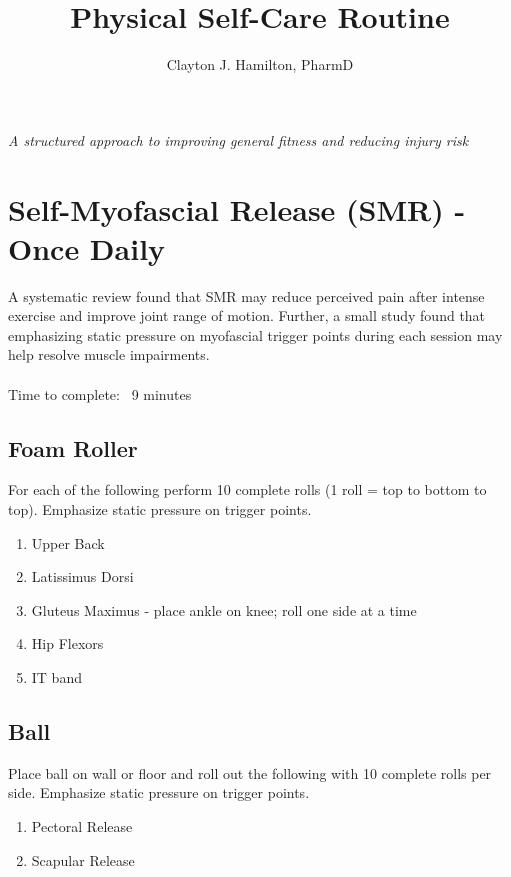 \documentclass[12pt, letterpaper]{article}
\title{Physical Self-Care Routine}
\author{Clayton J. Hamilton, PharmD}
\date{}
\begin{document}
\maketitle

\centerline{\textit{A structured approach to improving general fitness and reducing injury risk}}

\tableofcontents

\newpage %


\section{Self-Myofascial Release (SMR) - Once Daily}

A systematic review found that SMR may reduce perceived pain after 
intense exercise and improve joint range of motion.\cite{pmid26618062} Further, a small study found that
 emphasizing static pressure on myofascial trigger points during each session may help resolve muscle impairments.\cite{pmid30765920} 
 \\
 \\
Time to complete: ~9 minutes

\subsection{Foam Roller}

For each of the following perform 10 complete rolls (1 roll = top to bottom to top). Emphasize static pressure on trigger points.
\begin{enumerate}
    \item Upper Back
    \item Latissimus Dorsi
    \item Gluteus Maximus - place ankle on knee; roll one side at a time
    \item Hip Flexors
    \item IT band
\end{enumerate}

\subsection{Ball}
Place ball on wall or floor and roll out the following with 10 complete rolls per side. Emphasize static pressure on trigger points.
\begin{enumerate}
    \item Pectoral Release
    \item Scapular Release
\end{enumerate}
\end{document}
